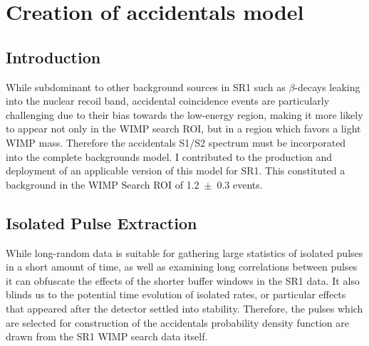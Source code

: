 \section{Creation of accidentals model}
\subsection{Introduction}
While subdominant to other background sources in SR1 such as $\beta$-decays leaking into the nuclear recoil band, accidental coincidence events are particularly challenging due to their bias towards the low-energy region, making it more likely to appear not only in the WIMP search ROI, but in a region which favors a light WIMP mass.
Therefore the accidentals S1/S2 spectrum must be incorporated into the complete backgrounds model.
I contributed to the production and deployment of an applicable version of this model for SR1.
This constituted a background in the WIMP Search ROI of 1.2~$\pm$~0.3 events\cite{aalbers_first_2022}.

\subsection{Isolated Pulse Extraction}
\label{sec:is1_selection}

While long-random data is suitable for gathering large statistics of isolated pulses in a short amount of time, as well as examining long correlations between pulses it can obfuscate the effects of the shorter buffer windows in the SR1 data.
It also blinds us to the potential time evolution of isolated rates, or particular effects that appeared after the detector settled into stability.
Therefore, the pulses which are selected for construction of the accidentals probability density function are drawn from the SR1 WIMP search data itself.




